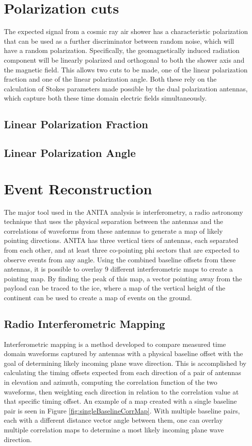 \section{Polarization cuts}
	The expected signal from a cosmic ray air shower has a characteristic polarization that can be used as a further discriminator between random noise, which will have a random polarization.  Specifically, the geomagnetically induced radiation component will be linearly polarized and orthogonal to both the shower axis and the magnetic field.  This allows two cuts to be made, one of the linear polarization fraction and one of the linear polarization angle.  Both these rely on the calculation of Stokes parameters made possible by the dual polarization antennas, which capture both these time domain electric fields simultaneously.

	\subsection{Linear Polarization Fraction}
		
	\subsection{Linear Polarization Angle}

	
\section{Event Reconstruction}
	The major tool used in the ANITA analysis is interferometry, a radio astronomy technique that uses the physical separation between the antennas and the correlations of waveforms from these antennas to generate a map of likely pointing directions.  ANITA has three vertical tiers of antennas, each separated from each other, and at least three co-pointing phi sectors that are expected to observe events from any angle.  Using the combined baseline offsets from these antennas, it is possible to overlay 9 different interferometric maps to create a pointing map.  By finding the peak of this map, a vector pointing away from the payload can be traced to the ice, where a map of the vertical height of the continent can be used to create a map of events on the ground.
	
	\subsection{Radio Interferometric Mapping}
		Interferometric mapping is a method developed to compare measured time domain waveforms captured by antennas with a physical baseline offset with the goal of determining likely incoming plane wave direction.  This is accomplished by calculating the timing offsets expected from each direction of a pair of antennas in elevation and azimuth, computing the correlation function of the two waveforms, then weighting each direction in relation to the correlation value at that specific timing offset.  An example of a map created with a single baseline pair is seen in Figure \ref{fig:singleBaselineCorrMap}.  With multiple baseline pairs, each with a different distance vector angle between them, one can overlay multiple correlation maps to determine a most likely incoming plane wave direction.
		
